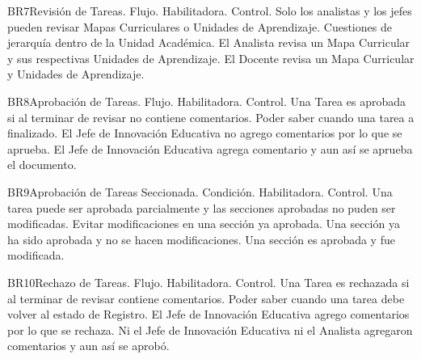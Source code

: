 \begin{BussinesRule}{BR7}{Revisión de Tareas.}
    \BRitem[Tipo:] Flujo.
    \BRitem[Clase:] Habilitadora.
    \BRitem[Nivel:] Control.
    \BRitem[Descripción:] Solo los analistas y los jefes  pueden revisar Mapas Curriculares o Unidades de Aprendizaje.
    \BRitem[Motivación:] Cuestiones de jerarquía dentro de la Unidad Académica.
     El Analista revisa un Mapa Curricular y sus respectivas Unidades de Aprendizaje.
     El Docente revisa un Mapa Curricular y Unidades de Aprendizaje.
\end{BussinesRule}

\begin{BussinesRule}{BR8}{Aprobación de Tareas.}
    \BRitem[Tipo:] Flujo.
    \BRitem[Clase:] Habilitadora.
    \BRitem[Nivel:] Control.
    \BRitem[Descripción:] Una Tarea es aprobada si al terminar de revisar no contiene comentarios.
    \BRitem[Motivación:] Poder saber cuando una tarea a finalizado.
     El Jefe de Innovación Educativa no agrego comentarios por lo que se aprueba.
     El Jefe de Innovación Educativa agrega comentario y aun así se aprueba el documento.
\end{BussinesRule}

\begin{BussinesRule}{BR9}{Aprobación de Tareas Seccionada.}
    \BRitem[Tipo:] Condición.
    \BRitem[Clase:] Habilitadora.
    \BRitem[Nivel:] Control.
    \BRitem[Descripción:]
    \BRitem[Sentencia:] Una tarea puede ser aprobada parcialmente y las secciones aprobadas no puden ser modificadas.
    \BRitem[Motivación:] Evitar modificaciones en una sección ya aprobada.
     Una sección ya ha sido aprobada y no se hacen modificaciones.
     Una sección es aprobada y fue modificada.
\end{BussinesRule}

\begin{BussinesRule}{BR10}{Rechazo de Tareas.}
    \BRitem[Tipo:] Flujo.
    \BRitem[Clase:] Habilitadora.
    \BRitem[Nivel:] Control.
    \BRitem[Descripción:] Una Tarea es rechazada si al terminar de revisar contiene comentarios.
    \BRitem[Motivación:] Poder saber cuando una tarea debe volver al estado de Registro.
     El Jefe de Innovación Educativa agrego comentarios por lo que se rechaza.
     Ni el Jefe de Innovación Educativa ni el Analista agregaron comentarios y aun así se aprobó.
\end{BussinesRule}

